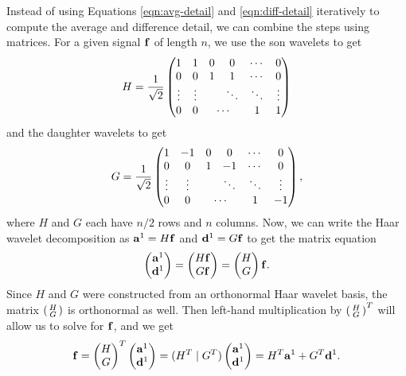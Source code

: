 \documentclass{article}
\theoremstyle{definition}
\begin{document}
  Instead of using Equations \eqref{eqn:avg-detail} and \eqref{eqn:diff-detail} iteratively to compute the average and difference detail, we can combine the steps using matrices.
  For a given signal \(\vb{f}\) of length \(n\), we use the son wavelets to get
  \begin{equation}
    H = \frac{1}{\sqrt{2}}
    \begin{pmatrix}
      1 & 1 & 0 & 0 & \cdots & 0\\
      0 & 0 & 1 & 1 & \cdots & 0\\
      \vdots & \vdots &  & \ddots & \ddots & \vdots\\
      0 & 0 & \multicolumn{2}{c}{\cdots} & 1 & 1
    \end{pmatrix}
  \end{equation}
  and the daughter wavelets to get
  \begin{equation}
    G = \frac{1}{\sqrt{2}}
    \begin{pmatrix}
      1 & -1 & 0 & 0 & \cdots & 0\\
      0 & 0 & 1 & -1 & \cdots & 0\\
      \vdots & \vdots &  & \ddots & \ddots & \vdots\\
      0 & 0 & \multicolumn{2}{c}{\cdots} & 1 & -1
    \end{pmatrix},
  \end{equation}
  where \(H\) and \(G\) each have \(n/2\) rows and \(n\) columns. Now, we can write the Haar wavelet decomposition as \(\vb{a}^1 = H \vb{f}\) and \(\vb{d}^1 = G\vb{f}\) to get the matrix equation
  \begin{equation}
    \begin{pmatrix}
      \vb{a}^1 \\ \vb{d}^1
    \end{pmatrix} =
    \begin{pmatrix}
      H\vb{f} \\ G\vb{f}
    \end{pmatrix} =
    \begin{pmatrix}
      H \\ G
    \end{pmatrix} \vb{f}.
  \end{equation}
  Since \(H\) and \(G\) were constructed from an orthonormal Haar wavelet basis, the matrix \(\smqty(H \\ G)\) is orthonormal as well. Then left-hand multiplication by \(\smqty(H \\ G)^T\) will allow us to solve for \(\vb{f}\), and we get
  \begin{equation}
    \vb{f} =
    \begin{pmatrix}
      H \\ G
    \end{pmatrix}^T
    \begin{pmatrix}
      \vb{a}^1 \\ \vb{d}^1
    \end{pmatrix} =
      (H^T \mid G^T)
    \begin{pmatrix}
      \vb{a}^1 \\ \vb{d}^1
    \end{pmatrix} =
    H^T \vb{a}^1 + G^T \vb{d}^1.
  \end{equation}
\end{document}
